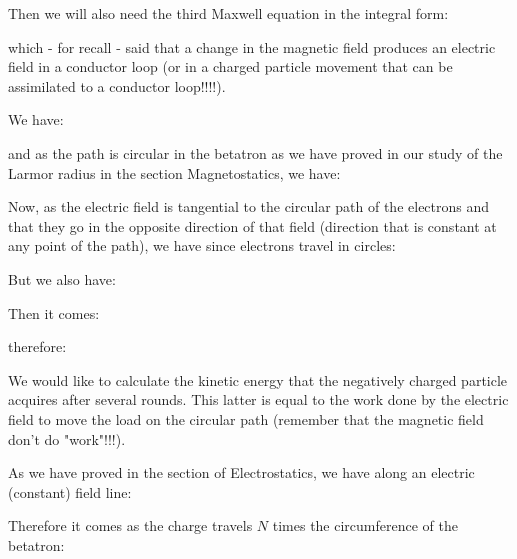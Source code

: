 	Then we will also need the third Maxwell equation in the integral form:
	
	which - for recall - said that a change in the magnetic field produces an electric field in a conductor loop (or in a charged particle movement that can be assimilated to a conductor loop!!!!).
	
	We have:
	
	and as the path is circular in the betatron as we have proved in our study of the Larmor radius in the section Magnetostatics, we have:
	
	Now, as the electric field is tangential to the circular path of the electrons and that they go in the opposite direction of that field (direction that is constant at any point of the path), we have since electrons travel in circles:
	
	But we also have:
	
	Then it comes:
	
	therefore:
	
	We would like to calculate the kinetic energy that the negatively charged particle acquires after several rounds. This latter is equal to the work done by the electric field to move the load on the circular path (remember that the magnetic field don't do "work"!!!).
	
	As we have proved in the section of Electrostatics, we have along an electric (constant) field line:
	
	Therefore it comes as the charge travels $N$ times the circumference of the betatron:
	
